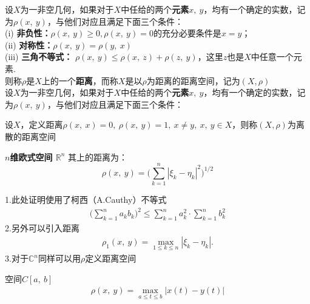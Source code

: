 \begin{newdef}
	设$X$为一非空几何，如果对于$X$中任给的两个\textbf{元素}$x,\ y$，均有一个确定的实数，记为$\rho\left( x, \ y \right)$，与他们对应且满足下面三个条件：\\
	(i) \textbf{非负性：}$\rho (x,\ y)\geqslant 0, \rho (x,\ y)=0 $的充分必要条件是$x=y$；\\
	(ii) \textbf{对称性：}$\rho (x,\ y)=\rho (y, \ x)$\\
	(iii) \textbf{三角不等式：} $\rho (x,\ y)\leqslant \rho (x,\ z)+\rho (z, \ y)$，这里$z$也是$X$中任意一个元素.\\
	则称$\rho $是$X$上的一个\textbf{距离}，而称$X$是以$\rho$为距离的距离空间，记为$(X, \rho)$\\
	设$X$为一非空几何，如果对于$X$中任给的两个\textbf{元素}$x,\ y$，均有一个确定的实数，记为$\rho\left( x, \ y \right)$，与他们对应且满足下面三个条件：
\end{newdef}

\begin{note}
	设$X$，定义距离$\rho(x, \ x )=0,\  \rho(x, \ y)=1 , \ x\neq y, \ x, \ y \in X$，则称$(X,\rho)$为离散的距离空间
\end{note}


\begin{newex}
	\textbf{$n$维欧式空间 $\mathbb R ^n$}
	其上的距离为：
	\begin{equation}
		\rho (x, \ y)=\big( \sum\limits_{k=1}^n | \xi_k- \eta_k|^2 \big)^{1/2} \label{eq:rho1}
	\end{equation}
\end{newex}

\begin{note}
	1.此处证明使用了柯西（A.Cauthy）不等式
	\begin{align}
		\big(\sum \limits_{k=1}^n a_k b_k \big)^2 \leqslant \sum \limits_{k=1}^n a_k^2 \cdot \sum \limits_{k=1}^n b_k^2
	\end{align}
	2.另外可以引入距离
	\begin{align*}
		\rho_1(x,\ y)=\max \limits_{1\leqslant k \leqslant n}|\xi_k-\eta_k|. \tag*{(1')}
		\label{eq:rho1'}
	\end{align*}
	3.对于$\mathbb C^n$同样可以用$\rho$定义距离空间
\end{note}

\begin{newex}
	空间$C[a,\ b]$
	\begin{align}
		\rho(x, \ y)=\max\limits_{a \leqslant t \leqslant b} |x(t)-y(t)|
		\label{eq:rho3}
	\end{align}
\end{newex}

